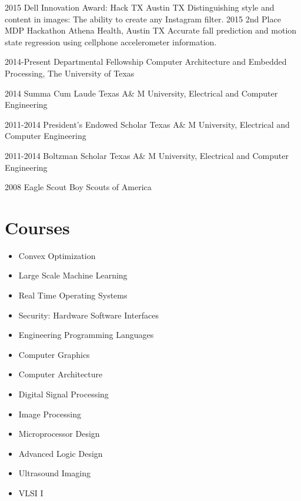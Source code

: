 \documentclass[]{friggeri-cv} %
\begin{document}
\begin{entrylist}

\entry
{2015}
{Dell Innovation Award: Hack TX} 
{Austin TX}
{Distinguishing style and content in images: The ability to create any Instagram filter.}
\entry
{2015}
{2nd Place MDP Hackathon} 
{Athena Health, Austin TX}
{Accurate fall prediction and motion state regression using cellphone accelerometer information.}

\entry
{2014-Present}
{Departmental Fellowship}
{Computer Architecture and Embedded Processing, The University of Texas}
{}

\entry
{2014}
{Summa Cum Laude}
{Texas A\& M University,  Electrical and Computer Engineering}
{}

\entry
{2011-2014}
{President's Endowed Scholar}
{Texas A\& M University,  Electrical and Computer Engineering}
{}

\entry
{2011-2014}
{Boltzman Scholar}
{Texas A\& M University,  Electrical and Computer Engineering}
{}

\entry
{2008}
{Eagle Scout}
{Boy Scouts of America}
{}

\end{entrylist}

\section{Courses}
\begin{itemize}
\item Convex Optimization
\item Large Scale Machine Learning
\item Real Time Operating Systems
\item Security: Hardware Software Interfaces
\item Engineering Programming Languages
\item Computer Graphics
\item Computer Architecture
\item Digital Signal Processing
\item Image Processing
\item Microprocessor Design
\item Advanced Logic Design
\item Ultrasound Imaging
\item VLSI I
\end{itemize}
\end{document}
